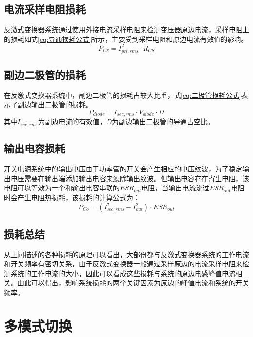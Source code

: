 \subsection{电流采样电阻损耗}

反激式变换器系统通过使用外接电流采样电阻来检测变压器原边电流，采样电阻上的损耗如式\eqref{eq:导通损耗公式}所示，主要受到采样电阻和原边电流有效值的影响。
\begin{equation}
    \label{eq:采样电阻损耗公式}
    P_{CS} = I_{pri,rms}^2  \cdot R_{CS} 
\end{equation}


\subsection{副边二极管的损耗}

在反激式变换器系统中，副边二极管的损耗占较大比重，式\eqref{eq:二极管损耗公式}表示了副边输出二极管的损耗。
\begin{equation}
    \label{eq:二极管损耗公式}
    P_{diode} = I_{sec,rms} \cdot V_{diode} \cdot D 
\end{equation}
其中$I_{sec,rms}$为副边电流的有效值，$D$为副边输出二极管的导通占空比。

\subsection{输出电容损耗}

开关电源系统中的输出电压由于功率管的开关会产生相应的电压纹波，为了稳定输出电压需要在输出端添加输出电容来滤除输出纹波。但输出电容存在寄生电阻，该电阻可以等效为一个和输出电容串联的$ESR_{out}$电阻，当输出电流流过$ESR_{out}$电阻时会产生电阻热损耗，该损耗的计算公式为：
\begin{equation}
    \label{eq:ESR损耗公式}
    P_{Co} = (I_{sec,rms}^2 - I_{out}^2) \cdot ESR_{out}
\end{equation}

\subsection{损耗总结}

从上问描述的各种损耗的原理可以看出，大部份都与反激式变换器系统的工作电流和开关频率有密切关系，由于反激式变换器一般通过采样原边的电流采样电阻来检测系统的工作电流的大小，因此可以看成这些损耗与系统的原边电感峰值电流相关。由此可以得出，影响系统损耗的两个关键因素为原边的峰值电流和系统的开关频率。

\section{多模式切换}

